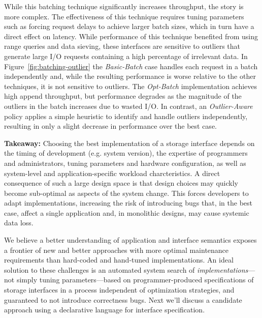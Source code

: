 While this batching technique significantly increases throughput, the story is
more complex. The effectiveness of this technique requires tuning parameters
such as forcing request delays to achieve larger batch sizes, which in turn
have a direct effect on latency. While performance of this technique benefited
from using range queries and data sieving, these interfaces are sensitive to
outliers that generate large I/O requests containing a high percentage of
irrelevant data.  In Figure~\ref{fig:batching-outlier} the \emph{Basic-Batch}
case handles each request in a batch independently and, while the resulting
performance is worse relative to the other techniques, it is not sensitive to
outliers. The \emph{Opt-Batch} implementation achieves high append throughput,
but performance degrades as the magnitude of the outliers in the batch
increases due to wasted I/O. In contrast, an \emph{Outlier-Aware} policy
applies a simple heuristic to identify and handle outliers independently,
resulting in only a slight decrease in performance over the best case.

\textbf{Takeaway:} Choosing the best implementation of a storage interface
depends on the timing of development (e.g. system version), the expertise of
programmers and administrators, tuning parameters and hardware configuration,
as well as system-level and application-specific workload charcteristics. A
direct consequence of such a large design space is that design choices may
quickly become sub-optimal as aspects of the system change.  This forces
developers to adapt implementations, increasing the risk of introducing bugs that, in the
best case, affect a single application and, in monolithic designs, may
cause systemic data loss.

We believe a better understanding of application and interface semantics
exposes a frontier of new and better approaches with more optimal maintenance
requirements than hard-coded and hand-tuned implementations. An ideal solution
to these challenges is an automated system search of
\emph{implementations}---not simply tuning parameters---based on
programmer-produced specifications of storage interfaces in a process
independent of optimization strategies, and guaranteed to not introduce
correctness bugs. Next we'll discuss a candidate approach using a declarative
language for interface specification.
